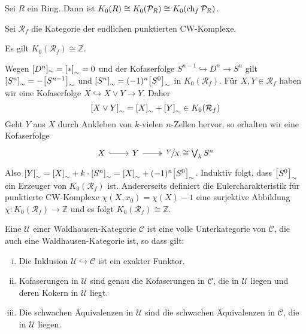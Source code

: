 \begin{proposition}
	Sei $R$ ein Ring.
	Dann ist $K_0(R) \cong K_0(\mathcal{P}_R) \cong K_0 (\ch_f \mathcal{P}_R)$.
\end{proposition}

\newpage

\begin{beispiel}
	Sei $\mathcal{R}_f$ die Kategorie der endlichen punktierten CW-Komplexe.
\end{beispiel}

\begin{proposition}
	Es gilt $K_0(\mathcal{R}_f) \cong \mathbb{Z}$.
\end{proposition}
\begin{beweis}
	Wegen $[D^n]_\sim = \benbrace*{*}_\sim =0$ und der Kofaserfolge $S^{n-1} \hookrightarrow D^n \to S^n$ gilt $\benbrace*{S^n}_\sim = - \benbrace*{S^{n-1}}_\sim$ und $\benbrace*{S^n}_\sim = (-1)^n \benbrace*{S^0}_\sim$ in $K_0(\mathcal{R}_f)$.
	Für $X,Y \in \mathcal{R}_f$ haben wir eine Kofaserfolge $X \hookrightarrow X \vee Y \to Y$.
	Daher 
	\[
		\benbrace*{X \vee Y}_\sim = \benbrace*{X}_\sim + \benbrace*{Y}_\sim \in K_0(\mathcal{R}_f)
	\]
	Geht $Y$ aus $X$ durch Ankleben von $k$-vielen $n$-Zellen hervor, so erhalten wir eine Kofaserfolge
	\[
		\begin{tikzcd}
			X \rar[hook] & Y \rar[two heads] & \sfrac{Y}{X} \cong \bigvee_k S^n
		\end{tikzcd}
	\]
	Also $\benbrace*{Y}_\sim = \benbrace*{X}_\sim + k \cdot \benbrace*{S^n}_\sim = \benbrace*{X}_\sim + (-1)^n \benbrace*{S^0}_\sim$.
	Induktiv folgt, dass $\benbrace*{S^0}_\sim$ ein Erzeuger von $K_0(\mathcal{R}_f)$ ist.
	Andererseits definiert die Eulercharakteristik für punktierte CW-Komplexe $\chi(X,x_0) = \chi(X)-1$ eine surjektive Abbildung $\chi \colon K_0(\mathcal{R}_f) \to \mathbb{Z}$ und es folgt $K_0(\mathcal{R}_f) \cong \mathbb{Z}$. 
\end{beweis}

\begin{definition}
	Eine  $\mathcal{U}$ einer Waldhausen-Kategorie $\mathcal{C}$ ist eine volle Unterkategorie von $\mathcal{C}$, die auch eine Waldhausen-Kategorie ist, so dass gilt:
	\begin{enumerate}[i)]
		\item Die Inklusion $\mathcal{U} \hookrightarrow \mathcal{C}$ ist ein exakter Funktor.
		\item Kofaserungen in $\mathcal{U}$ sind genau die Kofaserungen in $\mathcal{C}$, die in $\mathcal{U}$ liegen und deren Kokern in $\mathcal{U}$ liegt.
		\item Die schwachen Äquivalenzen in $\mathcal{U}$ sind die schwachen Äquivalenzen in $\mathcal{C}$, die in $\mathcal{U}$ liegen.
	\end{enumerate} 
\end{definition}

